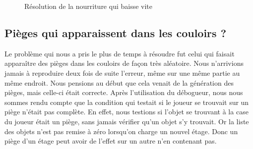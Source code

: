 \documentclass[11pt]{report}
\begin{document}
			\begin{figure}[ht]
			    \centering
			    \qquad
			    \caption{Résolution de la nourriture qui baisse vite}%
			\end{figure}
	
	\subsection*{Pièges qui apparaissent dans les couloirs ?}
	
		Le problème qui nous a pris le plus de temps à résoudre fut celui qui faisait apparaître des pièges dans les couloirs de façon très aléatoire. Nous n'arrivions jamais à reproduire deux fois de suite l'erreur, même sur une même partie au même endroit. Nous pensions au début que cela venait de la génération des pièges, mais celle-ci était correcte. Après l'utilisation du débogueur, nous nous sommes rendu compte que la condition qui testait si le joueur se trouvait sur un piège n'était pas complète. En effet, nous testions si l'objet se trouvant à la case du joueur était un piège, sans jamais vérifier qu'un objet s'y trouvait. Or la liste des objets n'est pas remise à zéro lorsqu'on charge un nouvel étage. Donc un piège d'un étage peut avoir de l'effet sur un autre n'en contenant pas.
\end{document}
